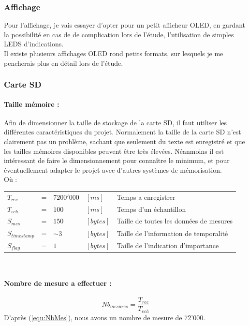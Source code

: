 {{}

\subsubsection{Affichage}
{
    Pour l'affichage, je vais essayer d'opter pour un petit afficheur OLED, en gardant la possibilité en cas de de complication lors de l'étude, l'utilisation de simples LEDS d'indications.
    \\
    Il existe plusieurs affichages OLED rond petits formats, sur lesquels je me pencherais plus en détail lors de l'étude.
}

\newpage
\subsubsection{Carte SD} \label{sssec:CarteSD}
{
    \paragraph{Taille mémoire : }
    Afin de dimensionner la taille de stockage de la carte SD, il faut utiliser les différentes caractéristiques du projet. Normalement la taille de la carte SD n'est clairement pas un problème, sachant que seulement du texte est enregistré et que les tailles mémoires disponibles peuvent être très élevées. Néanmoins il est intéressant de faire le dimensionnement pour connaître le minimum, et pour éventuellement adapter le projet avec d'autres systèmes de mémorisation.  \\
    Où : \vspace{+14pt} \\
    \begin{tabular}{l l ll|l}
       $ T_{rec} $ & = &  $7200'000$ & $[ms]$ & Temps a enregistrer \\
       $ T_{ech}$ & = & $100$  & $[ms]$ & Temps d'un échantillon \\
       $ S_{mes} $ & = & $150$ & $[bytes]$ & Taille de toutes les données de mesures  \\
       $ S_{timestamp} $ & = & $\sim$3 & $[bytes]$ & Taille de l'information de temporalité  \\
       $ S_{flag} $ & = & $ 1 $ & $[bytes]$ & Taille de l'indication d'importance 
    \end{tabular}
    \vspace{+14pt}
    \\
   \paragraph{ Nombre de mesure a effectuer :}
    \begin{equation} \label{equ:NbMes}
        Nb_{mesures} = \frac{T_{rec}}{T_{ech}}
    \end{equation} 
    D'après (\ref{equ:NbMes}), nous avons un nombre de mesure de 72'000.  \vspace{+8pt} \\
    
}}
